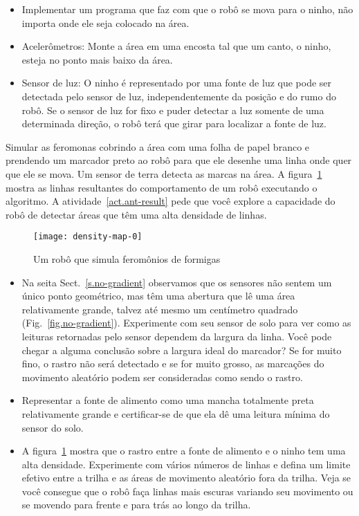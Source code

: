 \begin{framed}
\begin{itemize}
\item Implementar um programa que faz com que o robô se mova para o ninho, não importa onde ele seja colocado na área.
\item Acelerômetros: Monte a área em uma encosta tal que um canto, o ninho, esteja no ponto mais baixo da área. 
\item Sensor de luz: O ninho é representado por uma fonte de luz que pode ser detectada pelo sensor de luz, independentemente da posição e do rumo do robô. Se o sensor de luz for fixo e puder detectar a luz somente de uma determinada direção, o robô terá que girar para localizar a fonte de luz.
\end{itemize}
\end{framed}

Simular as feromonas cobrindo a área com uma folha de papel branco e prendendo um marcador preto ao robô para que ele desenhe uma linha onde quer que ele se mova. Um sensor de terra detecta as marcas na área. A figura~\ref{fig.ant-result} mostra as linhas resultantes do comportamento de um robô executando o algoritmo. A atividade~\ref{act.ant-result} pede que você explore a capacidade do robô de detectar áreas que têm uma alta densidade de linhas.

\begin{figure}
\begin{center}
\texttt{[image: density-map-0]}
\end{center}
\caption{Um robô que simula feromônios de formigas}\label{fig.ant-result}
\end{figure}

\begin{framed}
\begin{itemize}
\item Na seita Sect.~\ref{s.no-gradient} observamos que os sensores não sentem um único ponto geométrico, mas têm uma abertura que lê uma área relativamente grande, talvez até mesmo um centímetro quadrado (Fig.~\ref{fig.no-gradient}). Experimente com seu sensor de solo para ver como as leituras retornadas pelo sensor dependem da largura da linha. Você pode chegar a alguma conclusão sobre a largura ideal do marcador? Se for muito fino, o rastro não será detectado e se for muito grosso, as marcações do movimento aleatório podem ser consideradas como sendo o rastro.
\item Representar a fonte de alimento como uma mancha totalmente preta relativamente grande e certificar-se de que ela dê uma leitura mínima do sensor do solo.
\item A figura~\ref{fig.ant-result} mostra que o rastro entre a fonte de alimento e o ninho tem uma alta densidade. Experimente com vários números de linhas e defina um limite efetivo entre a trilha e as áreas de movimento aleatório fora da trilha. Veja se você consegue que o robô faça linhas mais escuras variando seu movimento ou se movendo para frente e para trás ao longo da trilha.
\end{itemize}
\end{framed}

